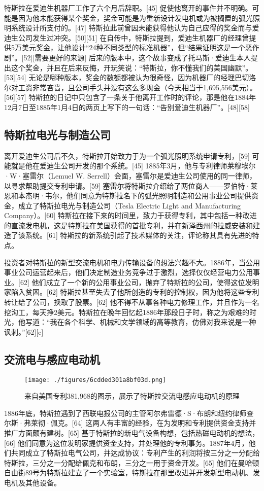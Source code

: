 特斯拉在爱迪生机器厂工作了六个月后辞职。[45] 促使他离开的事件并不明确。可能是因为他未能获得某个奖金，奖金可能是为重新设计发电机或为被搁置的弧光照明系统设计所支付的。[47] 特斯拉此前曾因未能获得他认为自己应得的奖金而与爱迪生公司发生过冲突。[50][51] 在自传中，特斯拉提到，爱迪生机器厂的经理曾提供5万美元奖金，让他设计“24种不同类型的标准机器”，但“结果证明这是一个恶作剧”。[52][需要更好的来源] 后来的版本中，这个故事变成了托马斯·爱迪生本人提出这个奖金，并且在后来反悔，开玩笑说：“特斯拉，你不懂我们的美国幽默”。[53][54] 无论是哪种版本，奖金的数额都被认为很奇怪，因为机器厂的经理巴切洛尔对工资非常吝啬，且公司手头并没有这么多现金（今天相当于1,695,556美元）。[56][57] 特斯拉的日记中只包含了一条关于他离开工作时的评论，那是他在1884年12月7日至1885年1月4日的两页上写下的一句话：“告别爱迪生机器厂”。[48][58]
\subsection{特斯拉电光与制造公司}  
离开爱迪生公司后不久，特斯拉开始致力于为一个弧光照明系统申请专利，[59] 可能就是他在爱迪生公司开发的那个系统。[45] 1885年3月，他与专利律师莱穆埃尔·W·塞雷尔（Lemuel W. Serrell）会面，塞雷尔是爱迪生公司使用的同一律师，以寻求帮助提交专利申请。[59] 塞雷尔将特斯拉介绍给了两位商人——罗伯特·莱恩和本杰明·韦尔，他们同意为特斯拉名下的弧光照明制造和公用事业公司提供资金，成立了特斯拉电光与制造公司（Tesla Electric Light and Manufacturing Company）。[60] 特斯拉在接下来的时间里，致力于获得专利，其中包括一种改进的直流发电机，这是特斯拉在美国获得的首批专利，并在新泽西州的拉威安装和建造了该系统。[61] 特斯拉的新系统引起了技术媒体的关注，评论称其具有先进的特点。

投资者对特斯拉的新型交流电机和电力传输设备的想法兴趣不大。1886年，当公用事业公司运营起来后，他们决定制造业务竞争过于激烈，选择仅仅经营电力公用事业。[62] 他们成立了一个新的公用事业公司，抛弃了特斯拉的公司，使得这位发明家陷入贫困。[62] 特斯拉甚至失去了他所创造的专利的控制权，因为他将这些专利转让给了公司，换取了股票。[62] 他不得不从事各种电力修理工作，并且作为一名挖沟工，每天挣2美元。特斯拉在晚年回忆起1886年那段日子时，称之为艰难的时光，他写道：“我在各个科学、机械和文学领域的高等教育，仿佛对我来说是一种讽刺。”[62][c]
\subsection{交流电与感应电动机}
\begin{figure}[ht]
\centering
\texttt{[image: ./figures/6cdded301a8bf03d.png]}
\caption{来自美国专利381,968的图示，展示了特斯拉交流电感应电动机的原理} \label{fig_Tesla_6}
\end{figure}
1886年底，特斯拉遇到了西联电报公司的主管阿尔弗雷德·S·布朗和纽约律师查尔斯·弗莱彻·佩克。[64] 这两人有丰富的经验，在为发明和专利提供资金支持并推广方面颇有建树。[65] 基于特斯拉的新电气设备构想，包括热磁电动机的想法，[66] 他们同意为这位发明家提供资金支持，并处理他的专利事务。1887年4月，他们共同成立了特斯拉电气公司，并达成协议：专利产生的利润将按三分之一分配给特斯拉，三分之一分配给佩克和布朗，三分之一用于资金开发。[65] 他们在曼哈顿自由街89号为特斯拉建立了一个实验室，特斯拉在那里改进并开发新型电动机、发电机及其他设备。


